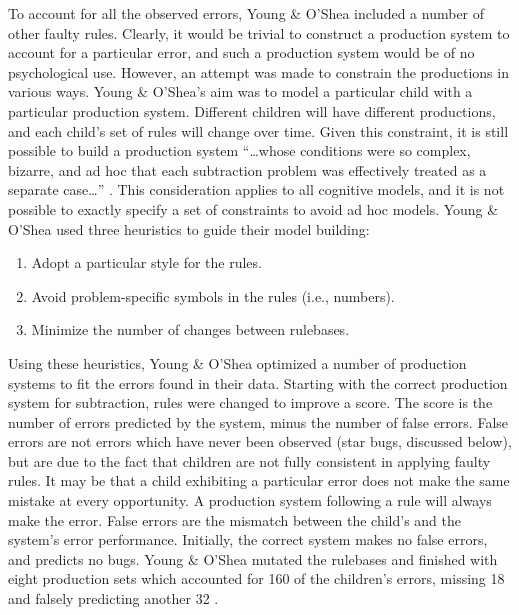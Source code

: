 To account for all the observed errors, Young \& O'Shea included a number
of other faulty rules.
Clearly, it would be trivial to construct a
production system to account for a particular error, and such a production
system would be of no psychological use.
However, an attempt was made to constrain the
productions in various ways.
Young \&
O'Shea's aim was
to model a particular child with a particular production
system.
Different children will have different productions, and each child's set of
rules will change over time.  Given this constraint, it is still possible
to build a production
system ``\ldots whose conditions were
so complex, bizarre, and ad hoc that each subtraction problem was
effectively treated as a separate case\ldots'' \cite[p.~164]{younerro}.
This consideration applies to all cognitive models, and it is not possible
to exactly specify a set of constraints to avoid ad hoc models.  Young \&
O'Shea used three heuristics to guide their model building:
\begin{enumerate}
\item Adopt a particular style for the rules.
\item Avoid problem-specific symbols in the rules (i.e., numbers).
\item Minimize the number of changes between rulebases.
\end{enumerate}


Using these heuristics, Young \& O'Shea optimized a number of production
systems to fit the errors found in their data.  Starting with the correct
production system for subtraction, rules were changed to improve a score.
The score is the number of errors predicted by the system, minus the number
of false errors. False errors are not errors which have never been observed
(star bugs, discussed below), but are due to the fact that children are not
fully consistent in applying faulty rules. It may be that a child
exhibiting a particular error does not make the same mistake at every
opportunity. A production system following a rule will always make the
error. False errors are the mismatch between the child's and the system's
error performance. Initially, the correct system makes no false errors, and
predicts no bugs.  Young \& O'Shea mutated the rulebases and finished with
eight production sets which accounted for 160 of the children's errors,
missing 18 and falsely predicting another 32 \citeyear[table~3,
p.~166]{younerro}.


